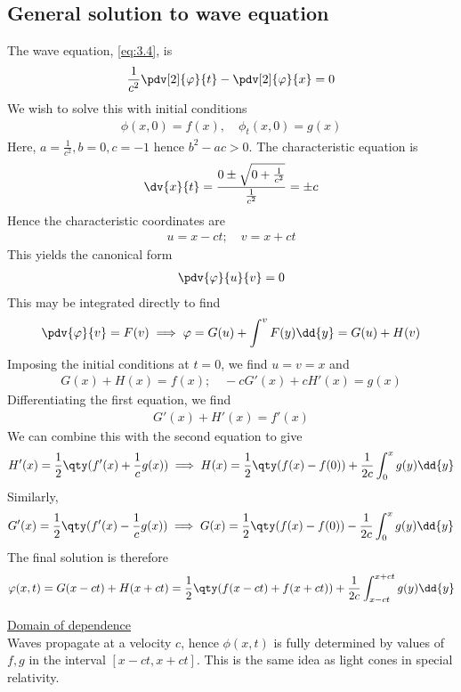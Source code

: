 \subsection{General solution to wave equation}
The wave equation, \cref{eq:3.4}, is
\begin{align*}
	\frac{1}{c^2} \pdv[2]{\phi}{t} - \pdv[2]{\phi}{x} = 0
\end{align*}
We wish to solve this with initial conditions
\begin{align} \label{eq:9.16}
	\phi(x,0) = f(x),\quad \phi_t(x,0) = g(x)
\end{align} 
Here, $a = \frac{1}{c^2}, b = 0, c = -1$ hence $b^2 - ac > 0$.
The characteristic equation is
\begin{align*}
	\dv{x}{t} = \frac{0 \pm \sqrt{0 + \frac{1}{c^2}}}{\frac{1}{c^2}} = \pm c
\end{align*}
Hence the characteristic coordinates are
\begin{align*}
	u = x - ct;\quad v = x + ct
\end{align*}
This yields the canonical form
\begin{align} \label{eq:9.17}
	\pdv{\phi}{u}{v} = 0
\end{align}
This may be integrated directly to find
\begin{align*}
	\pdv{\phi}{v} = F(v) \implies \phi = G(u) + \int^v F(y) \dd{y} = G(u) + H(v)
\end{align*}
Imposing the initial conditions at $t = 0$, we find $u = v = x$ and
\begin{align*}
	G(x) + H(x) = f(x);\quad -cG'(x) + cH'(x) = g(x)
\end{align*}
Differentiating the first equation, we find
\begin{align*}
	G'(x) + H'(x) = f'(x)
\end{align*}
We can combine this with the second equation to give
\begin{align*}
	H'(x) = \frac{1}{2} \qty(f'(x) + \frac{1}{c}g(x)) \implies H(x) = \frac{1}{2} \qty(f(x) - f(0)) + \frac{1}{2c}\int_0^x g(y) \dd{y}
\end{align*}
Similarly,
\begin{align*}
	G'(x) = \frac{1}{2} \qty(f'(x) - \frac{1}{c}g(x)) \implies G(x) = \frac{1}{2} \qty(f(x) - f(0)) - \frac{1}{2c}\int_0^x g(y) \dd{y}
\end{align*}
The final solution is therefore
\begin{align} \label{eq:9.18}
	\phi(x,t) = G(x-ct) + H(x+ct) = \frac{1}{2}\qty(f(x-ct) + f(x+ct)) + \frac{1}{2c} \int_{x-ct}^{x+ct} g(y) \dd{y}
\end{align}

\underline{Domain of dependence} \\
Waves propagate at a velocity $c$, hence $\phi(x,t)$ is fully determined by values of $f, g$ in the interval $[x-ct, x+ct]$.
This is the same idea as light cones in special relativity.
